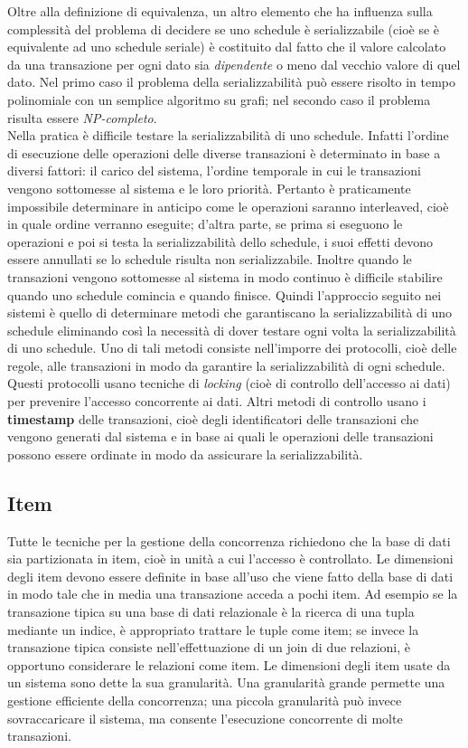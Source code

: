 Oltre alla definizione di equivalenza, un altro elemento che ha influenza sulla complessità del
problema di decidere se uno schedule è serializzabile (cioè se è equivalente ad uno schedule seriale)
è costituito dal fatto che il valore calcolato da una transazione per ogni dato sia \emph{dipendente} o meno
dal vecchio valore di quel dato. Nel primo caso il problema della serializzabilità può essere risolto
in tempo polinomiale con un semplice algoritmo su grafi; nel secondo caso il problema risulta
essere \emph{NP-completo}.\\
Nella pratica è difficile testare la serializzabilità di uno schedule. Infatti l'ordine di esecuzione delle
operazioni delle diverse transazioni è determinato in base a diversi fattori: il carico del sistema,
l'ordine temporale in cui le transazioni vengono sottomesse al sistema e le loro priorità. Pertanto è
praticamente impossibile determinare in anticipo come le operazioni saranno interleaved, cioè in
quale ordine verranno eseguite; d'altra parte, se prima si eseguono le operazioni e poi si testa la
serializzabilità dello schedule, i suoi effetti devono essere annullati se lo schedule risulta non
serializzabile. Inoltre quando le transazioni vengono sottomesse al sistema in modo continuo è
difficile stabilire quando uno schedule comincia e quando finisce. Quindi l'approccio seguito nei
sistemi è quello di determinare metodi che garantiscano la serializzabilità di uno schedule
eliminando così la necessità di dover testare ogni volta la serializzabilità di uno schedule. Uno di
tali metodi consiste nell'imporre dei protocolli, cioè delle regole, alle transazioni in modo da
garantire la serializzabilità di ogni schedule. Questi protocolli usano tecniche di \emph{locking} (cioè di
controllo dell'accesso ai dati) per prevenire l'accesso concorrente ai dati. Altri metodi di controllo
usano i \textbf{timestamp} delle transazioni, cioè degli identificatori delle transazioni che vengono generati
dal sistema e in base ai quali le operazioni delle transazioni possono essere ordinate in modo da
assicurare la serializzabilità.

\subsection{Item}
Tutte le tecniche per la gestione della concorrenza richiedono che la base di dati sia partizionata in
item, cioè in unità a cui l'accesso è controllato. Le dimensioni degli item devono essere definite in
base all'uso che viene fatto della base di dati in modo tale che in media una transazione acceda a
pochi item. Ad esempio se la transazione tipica su una base di dati relazionale è la ricerca di una
tupla mediante un indice, è appropriato trattare le tuple come item; se invece la transazione tipica
consiste nell'effettuazione di un join di due relazioni, è opportuno considerare le relazioni come
item. Le dimensioni degli item usate da un sistema sono dette la sua granularità. Una granularità
grande permette una gestione efficiente della concorrenza; una piccola granularità può invece
sovraccaricare il sistema, ma consente l'esecuzione concorrente di molte transazioni.

